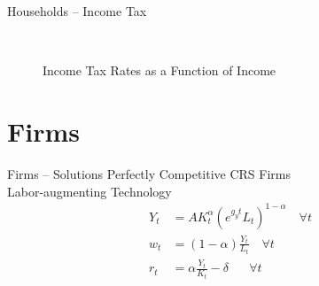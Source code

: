 \documentclass{beamer}
\begin{document}
  \begin{frame}{Households -- Income Tax}\label{Income Tax}
      \begin{figure}[htb]\centering
         \caption{Income Tax Rates as a Function of Income}
          \\
      \end{figure}
      \hyperlink{income}{}
  \end{frame}  

\section{Firms}
  \begin{frame}{Firms -- Solutions}
  Perfectly Competitive CRS Firms \\
  Labor-augmenting Technology
  \begin{align}
         Y_t & = A K_t^\alpha\left(e^{g_y t}L_t\right)^{1-\alpha} \quad \forall t \nonumber \\
         w_t &= (1-\alpha)\frac{Y_t}{L_t} \quad \forall t \nonumber \\
         r_t &= \alpha\frac{Y_t}{K_t} - \delta \quad\:\:\: \forall t  \nonumber
      \end{align}
  \end{frame}
\end{document}
